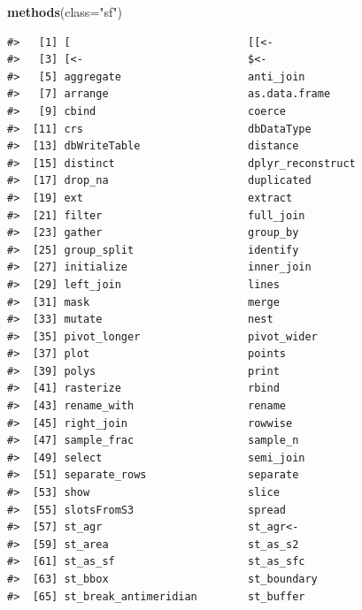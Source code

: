 \documentclass[
]{book}
\newenvironment{Shaded}{\begin{snugshade}}{\end{snugshade}}
\newcommand{\AttributeTok}[1]{\textcolor[rgb]{0.13,0.29,0.53}{#1}}
\newcommand{\FunctionTok}[1]{\textcolor[rgb]{0.13,0.29,0.53}{\textbf{#1}}}
\newcommand{\NormalTok}[1]{#1}
\newcommand{\StringTok}[1]{\textcolor[rgb]{0.31,0.60,0.02}{#1}}
\begin{document}
\begin{Shaded}
\begin{Highlighting}[]
\FunctionTok{methods}\NormalTok{(}\AttributeTok{class=}\StringTok{"sf"}\NormalTok{)}
\end{Highlighting}
\end{Shaded}

\begin{verbatim}
#>   [1] [                            [[<-                        
#>   [3] [<-                          $<-                         
#>   [5] aggregate                    anti_join                   
#>   [7] arrange                      as.data.frame               
#>   [9] cbind                        coerce                      
#>  [11] crs                          dbDataType                  
#>  [13] dbWriteTable                 distance                    
#>  [15] distinct                     dplyr_reconstruct           
#>  [17] drop_na                      duplicated                  
#>  [19] ext                          extract                     
#>  [21] filter                       full_join                   
#>  [23] gather                       group_by                    
#>  [25] group_split                  identify                    
#>  [27] initialize                   inner_join                  
#>  [29] left_join                    lines                       
#>  [31] mask                         merge                       
#>  [33] mutate                       nest                        
#>  [35] pivot_longer                 pivot_wider                 
#>  [37] plot                         points                      
#>  [39] polys                        print                       
#>  [41] rasterize                    rbind                       
#>  [43] rename_with                  rename                      
#>  [45] right_join                   rowwise                     
#>  [47] sample_frac                  sample_n                    
#>  [49] select                       semi_join                   
#>  [51] separate_rows                separate                    
#>  [53] show                         slice                       
#>  [55] slotsFromS3                  spread                      
#>  [57] st_agr                       st_agr<-                    
#>  [59] st_area                      st_as_s2                    
#>  [61] st_as_sf                     st_as_sfc                   
#>  [63] st_bbox                      st_boundary                 
#>  [65] st_break_antimeridian        st_buffer                   

\end{verbatim}
\end{document}
